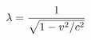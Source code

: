 \documentclass[preview]{standalone}
\begin{document}
\begin{align*}
\special{dvisvgm:raw <g id='unique000'>}\lambda = \frac{1}{\sqrt{1 - v^2/c^2}}\special{dvisvgm:raw </g>}
\end{align*}
\end{document}
